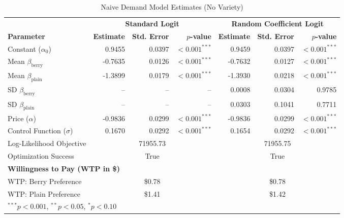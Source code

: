 \documentclass[11pt]{article}
\theoremstyle{definition}
\theoremstyle{remark}
\begin{document}
\begin{table}[htbp]
\centering
\caption{Naive Demand Model Estimates (No Variety)}
\label{tab:naive_estimates}
\renewcommand{\arraystretch}{1.2}
{\setlength{\tabcolsep}{3.5pt}
\begin{tabular}{l r r r r r r}
\toprule
& \multicolumn{3}{c}{\textbf{Standard Logit}} & \multicolumn{3}{c}{\textbf{Random Coefficient Logit}} \\
\cmidrule(lr){2-4} \cmidrule(lr){5-7}
\textbf{Parameter} & \textbf{Estimate} & \textbf{Std. Error} & \textbf{$p$-value} & \textbf{Estimate} & \textbf{Std. Error} & \textbf{$p$-value} \\
\midrule
Constant ($\alpha_0$) & 0.9455 & 0.0397 & $< 0.001^{***}$ & 0.9459 & 0.0397 & $< 0.001^{***}$ \\
Mean $\beta_{\text{berry}}$ & -0.7635 & 0.0126 &$< 0.001^{***}$ & -0.7632 & 0.0127 &$< 0.001^{***}$ \\
Mean $\beta_{\text{plain}}$ & -1.3899 & 0.0179 &$< 0.001^{***}$ & -1.3930 & 0.0218 &$< 0.001^{***}$ \\
SD $\beta_{\text{berry}}$ & -- & -- & -- & 0.0008 & 0.0304 & 0.9785 \\
SD $\beta_{\text{plain}}$ & -- & -- & -- & 0.0303 & 0.1041 & 0.7711 \\
Price ($\alpha$) & -0.9836 & 0.0299 & $< 0.001^{***}$ & -0.9836 & 0.0299 & $< 0.001^{***}$ \\
Control Function ($\sigma$) & 0.1670 & 0.0292 & $< 0.001^{***}$ & 0.1654 & 0.0292 & $< 0.001^{***}$ \\
\midrule
Log-Likelihood Objective & \multicolumn{3}{c}{71955.73} & \multicolumn{3}{c}{71955.75} \\
Optimization Success & \multicolumn{3}{c}{True} & \multicolumn{3}{c}{True} \\
\midrule
\multicolumn{7}{l}{\textbf{Willingness to Pay (WTP in \$)}} \\
WTP: Berry Preference & \multicolumn{3}{c}{\$0.78} & \multicolumn{3}{c}{\$0.78} \\
WTP: Plain Preference & \multicolumn{3}{c}{\$1.41} & \multicolumn{3}{c}{\$1.42} \\
\bottomrule
\multicolumn{7}{l}{\footnotesize {$^{***}p<0.001$, $^{**}p<0.05$, $^*p<0.10$}}
\end{tabular}}
\end{table}

\end{document}
